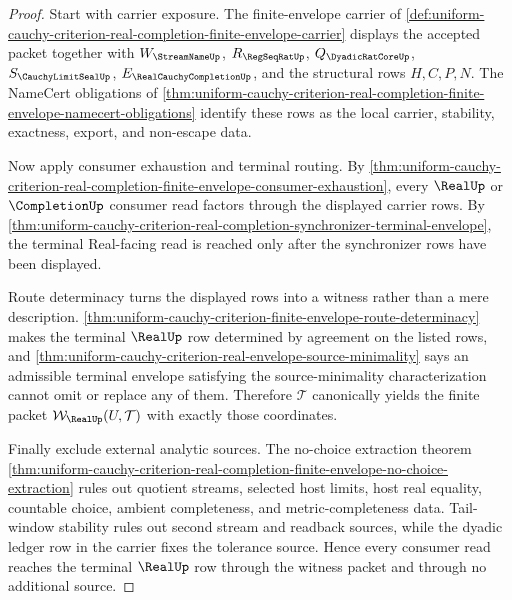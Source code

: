 \begin{proof}
Start with carrier exposure. The finite-envelope carrier of \autoref{def:uniform-cauchy-criterion-real-completion-finite-envelope-carrier} displays the accepted packet together with $W_{\StreamNameUp}$, $R_{\RegSeqRatUp}$, $Q_{\DyadicRatCoreUp}$, $S_{\CauchyLimitSealUp}$, $E_{\RealCauchyCompletionUp}$, and the structural rows $H,C,P,N$. The NameCert obligations of \autoref{thm:uniform-cauchy-criterion-real-completion-finite-envelope-namecert-obligations} identify these rows as the local carrier, stability, exactness, export, and non-escape data.

Now apply consumer exhaustion and terminal routing. By \autoref{thm:uniform-cauchy-criterion-real-completion-finite-envelope-consumer-exhaustion}, every $\RealUp$ or $\CompletionUp$ consumer read factors through the displayed carrier rows. By \autoref{thm:uniform-cauchy-criterion-real-completion-synchronizer-terminal-envelope}, the terminal Real-facing read is reached only after the synchronizer rows have been displayed.

Route determinacy turns the displayed rows into a witness rather than a mere description. \autoref{thm:uniform-cauchy-criterion-finite-envelope-route-determinacy} makes the terminal $\RealUp$ row determined by agreement on the listed rows, and \autoref{thm:uniform-cauchy-criterion-real-envelope-source-minimality} says an admissible terminal envelope satisfying the source-minimality characterization cannot omit or replace any of them. Therefore $\mathcal{T}$ canonically yields the finite packet $\mathcal{W}_{\RealUp}(U,\mathcal{T})$ with exactly those coordinates.

Finally exclude external analytic sources. The no-choice extraction theorem \autoref{thm:uniform-cauchy-criterion-real-completion-finite-envelope-no-choice-extraction} rules out quotient streams, selected host limits, host real equality, countable choice, ambient completeness, and metric-completeness data. Tail-window stability rules out second stream and readback sources, while the dyadic ledger row in the carrier fixes the tolerance source. Hence every consumer read reaches the terminal $\RealUp$ row through the witness packet and through no additional source.
\end{proof}

